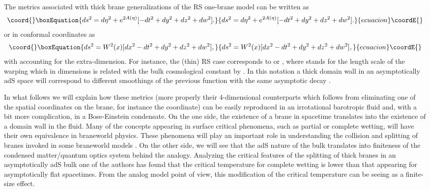 \documentclass[a4paper,prl,showpacs,twocolumn]{revtex4}
\begin{document}
The metrics associated with thick brane generalizations of the 
RS one-brane model \cite{RS2} can be written as   
%
\begin{equation}\coord{}\boxEquation{
ds^2 = d\eta^2 +e^{2A(\eta)}[-dt^2+dy^2+dz^2+dw^2].
}{
ds^2 = d\eta^2 +e^{2A(\eta)}[-dt^2+dy^2+dz^2+dw^2].
}{ecuacion}\coordE{}\end{equation}
%
or in conformal coordinates as
%
\begin{equation}\coord{}\boxEquation{
ds^2 = W^2(x)[dx^2-dt^2+dy^2+dz^2+dw^2],
\label{conformal-metric}
}{
ds^2 = W^2(x)[dx^2-dt^2+dy^2+dz^2+dw^2],
}{ecuacion}\coordE{}\end{equation}
%
with \coordHE{} 
accounting for the extra-dimension.
For instance, the (thin) RS case corresponds to
\coordHE{} or \coordHE{}, where \coordHE{} stands for
the length scale of the warping which in \coordHE{} dimensions is related 
with the bulk cosmological
constant by \coordHE{}. 
In this notation a thick domain wall in an asymptotically adS
space will correspond to different smoothings of the previous function
with the same asymptotic decay 
\coordHE{}.


In what follows we will explain how these metrics (more properly their
4-dimensional counterparts which follows from eliminating one of the 
spatial coordinates on the brane, for instance the \coordHE{} coordinate) can be
easily reproduced in an irrotational barotropic fluid and, with a bit
more complication, in a Bose-Einstein condensate. 
On the one side,
the existence of a brane in spacetime translates into the existence
of a domain wall in the fluid. Many of the concepts appearing
in surface critical phenomena, such as partial or complete wetting, 
will have their own equivalence in braneworld physics. 
These phenomena will play an important role in understanding
the collision and splitting of branes invoked in
some braneworld models \cite{turok}.
On the other side, we will see that the adS nature of the bulk translates
into finiteness of the condensed matter/quantum optics system behind the
analogy. 
Analyzing the critical features of the splitting of thick branes 
in an asymptotically
adS bulk one of the authors has found \cite{Cam:2002} that
the critical temperature for complete wetting is lower than that
appearing for asymptotically flat spacetimes. From the analog
model point of view, this modification of the critical temperature
can be seeing as a finite-size effect. 
\end{document}

